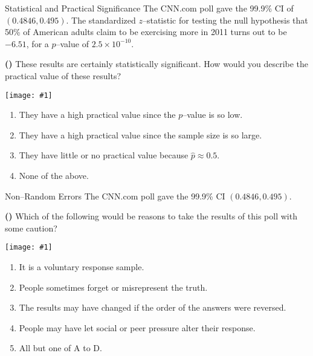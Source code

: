 \documentclass[13pt]{beamer}
\newcounter{count}
\newcommand{\question}{ \textbf{(\decimal{count})} \stepcounter{count}}
\newcommand{\pic}[2]{\hfill\texttt{[image: \#1]}\hspace*{\fill}}
\begin{document}
\begin{frame}{Statistical and Practical Significance}
The CNN.com poll gave the 99.9\% CI of
$(0.4846,0.495).$ The standardized $z$--statistic for testing the null hypothesis that 50\% of American adults claim to be exercising more in 2011 turns out to be $-6.51$, for a $p$--value of $2.5 \times 10^{-10}$. 


\begin{multicols}{2}
\question These results are certainly statistically significant. How would you describe the practical value of these results?

\begin{center}
   \pic{cnnpoll.PNG}{.6}
\end{center}

\end{multicols}

\begin{enumerate}[A]
   \item They have a high practical value since the $p$--value is so low.
   \item They have a high practical value since the sample size is so large.
   \item They have little or no practical value because $\hat{p} \approx 0.5$.%
   \item None of the above.
\end{enumerate}
\end{frame}

\begin{frame}{Non--Random Errors}
The CNN.com poll gave the 99.9\% CI 
$(0.4846,0.495).$ 


\begin{multicols}{2}
\question Which of the following would be reasons to take the results of this poll with some caution?

\begin{center}
   \pic{cnnpoll.PNG}{.6}
\end{center}

\end{multicols}

\begin{enumerate}[A]
   \item It is a voluntary response sample.
   \item People sometimes forget or misrepresent the truth.
   \item The results may have changed if the order of the answers were reversed.
   \item People may have let social or peer pressure alter their response.
   \item All but one of A to D. %
\end{enumerate}
\end{frame}
\end{document}
